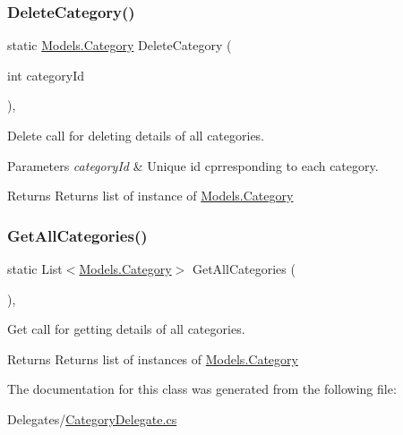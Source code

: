 \subsubsection{\texorpdfstring{Delete\+Category()}{DeleteCategory()}}
{\footnotesize\ttfamily static \hyperlink{classWildlifeTrackingApp_1_1Models_1_1Category}{Models.\+Category} Delete\+Category (\begin{DoxyParamCaption}\item[{int}]{category\+Id }\end{DoxyParamCaption})\hspace{0.3cm}{\ttfamily [inline]}, {\ttfamily [static]}}



Delete call for deleting details of all categories. 


\begin{DoxyParams}{Parameters}
{\em category\+Id} & Unique id cprresponding to each category.\\
\hline
\end{DoxyParams}
\begin{DoxyReturn}{Returns}
Returns list of instance of \hyperlink{classWildlifeTrackingApp_1_1Models_1_1Category}{Models.\+Category}
\end{DoxyReturn}
\mbox{\label{classWildlifeTrackingApp_1_1Delegates_1_1CategoryDelegate_a8c9a78152f0a7e86dc3ea0b828cdfd77}} 
\subsubsection{\texorpdfstring{Get\+All\+Categories()}{GetAllCategories()}}
{\footnotesize\ttfamily static List$<$\hyperlink{classWildlifeTrackingApp_1_1Models_1_1Category}{Models.\+Category}$>$ Get\+All\+Categories (\begin{DoxyParamCaption}{ }\end{DoxyParamCaption})\hspace{0.3cm}{\ttfamily [inline]}, {\ttfamily [static]}}



Get call for getting details of all categories. 

\begin{DoxyReturn}{Returns}
Returns list of instances of \hyperlink{classWildlifeTrackingApp_1_1Models_1_1Category}{Models.\+Category}
\end{DoxyReturn}


The documentation for this class was generated from the following file\+:\begin{DoxyCompactItemize}
\item 
Delegates/\hyperlink{CategoryDelegate_8cs}{Category\+Delegate.\+cs}\end{DoxyCompactItemize}
